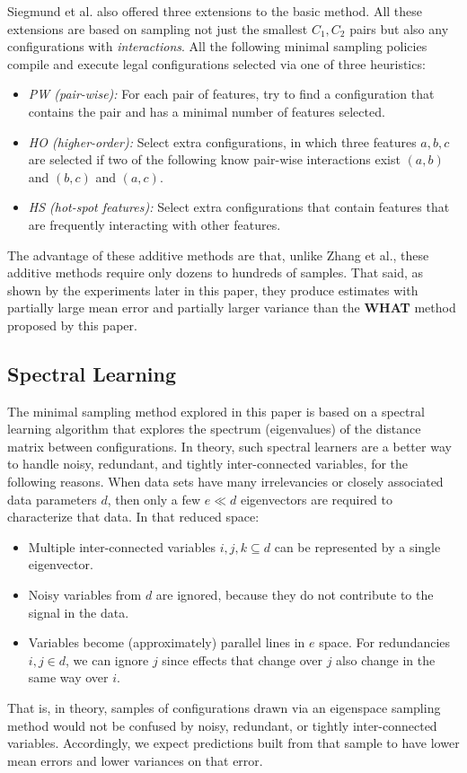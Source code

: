 \documentclass{sig-alternative}
\newcommand{\bi}{\begin{itemize}}%
\newcommand{\ei}{\end{itemize}}
\newcommand{\what}{{\bf WHAT }}
\begin{document}
Siegmund et al. also offered three extensions to the basic method. All these extensions are based on sampling
not just the smallest $C_1,C_2$  pairs but also any configurations with {\em interactions}. 
All the following minimal sampling policies compile and   execute legal configurations selected via one of three heuristics:
\bi
\item[{\em PW (pair-wise):}] For each pair of features, try to find a configuration that contains the pair and has a minimal number of features selected. 
\item[{\em HO (higher-order):}] Select extra configurations, in which three features $a,b,c$ are selected if two of the following know pair-wise interactions exist $(a,b)$ and $(b,c)$ and $(a,c)$.
\item[{\em HS (hot-spot features):}] Select extra configurations that contain features that are
frequently interacting with other features. 
\ei

The advantage of these additive methods are that, unlike  Zhang et al., these additive methods require only dozens to hundreds of samples. That said, as shown by the experiments later in this
paper, they produce estimates with partially large mean error and partially larger variance than the \what method proposed by this paper.
 

\subsection{Spectral Learning}\label{sect:spect}

The minimal sampling method explored in this paper is based on a spectral learning algorithm
that  explores the spectrum (eigenvalues) of the distance matrix between  configurations.
In theory, such spectral learners are a better way to handle noisy, redundant, and tightly inter-connected variables, for the following reasons.
When data sets have many irrelevancies or closely associated data parameters $d$, then
only a few $e \ll d$ eigenvectors are required to characterize that data.
In that reduced space:
\bi
\item
Multiple inter-connected variables $i,j,k \subseteq d$ can be represented
by a single eigenvector.
\item
Noisy variables from $d$ are
ignored, because they  do not contribute to the signal in the data.
\item
Variables  become (approximately) parallel lines
in $e$ space. For  redundancies \mbox{$i,j \in d$}, we
can ignore $j$
since effects that change over $j$ also
change in the same way over $i$.
\ei
That is, in theory, samples of configurations drawn via an eigenspace sampling method
would not be confused by noisy, redundant, or tightly inter-connected variables. Accordingly,
we expect predictions built from that sample to have  lower mean errors and lower variances on that error.
\end{document}
